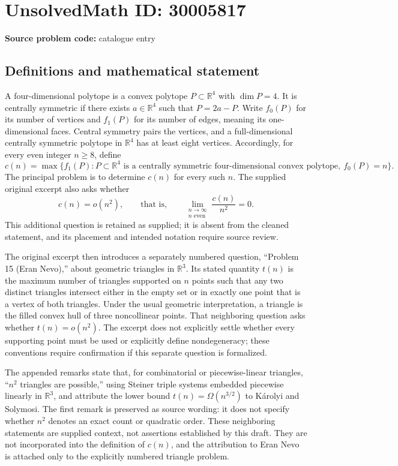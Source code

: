 \documentclass[11pt]{article}
\newcommand{\R}{\mathbb{R}}
\begin{document}
\section*{UnsolvedMath ID: 30005817}
\textbf{Source problem code:} catalogue entry
\subsection{Definitions and mathematical statement}
A four-dimensional polytope is a convex polytope \(P\subset\R^4\) with \(\dim P=4\). It is centrally symmetric if there exists \(a\in\R^4\) such that \(P=2a-P\). Write \(f_0(P)\) for its number of vertices and \(f_1(P)\) for its number of edges, meaning its one-dimensional faces. Central symmetry pairs the vertices, and a full-dimensional centrally symmetric polytope in \(\R^4\) has at least eight vertices. Accordingly, for every even integer \(n\geq8\), define
\[
c(n)=\max\{f_1(P):P\subset\R^4\text{ is a centrally symmetric four-dimensional convex polytope},\ f_0(P)=n\}.
\]
The principal problem is to determine \(c(n)\) for every such \(n\). The supplied original excerpt also asks whether
\[
c(n)=o(n^2),\qquad\text{that is,}\qquad
\lim_{\substack{n\to\infty\\n\text{ even}}}\frac{c(n)}{n^2}=0.
\]
This additional question is retained as supplied; it is absent from the cleaned statement, and its placement and intended notation require source review.

The original excerpt then introduces a separately numbered question, ``Problem 15 (Eran Nevo),'' about geometric triangles in \(\R^3\). Its stated quantity \(t(n)\) is the maximum number of triangles supported on \(n\) points such that any two distinct triangles intersect either in the empty set or in exactly one point that is a vertex of both triangles. Under the usual geometric interpretation, a triangle is the filled convex hull of three noncollinear points. That neighboring question asks whether \(t(n)=o(n^2)\). The excerpt does not explicitly settle whether every supporting point must be used or explicitly define nondegeneracy; these conventions require confirmation if this separate question is formalized.

The appended remarks state that, for combinatorial or piecewise-linear triangles, ``\(n^2\) triangles are possible,'' using Steiner triple systems embedded piecewise linearly in \(\R^3\), and attribute the lower bound \(t(n)=\Omega(n^{3/2})\) to K\'arolyi and Solymosi. The first remark is preserved as source wording: it does not specify whether \(n^2\) denotes an exact count or quadratic order. These neighboring statements are supplied context, not assertions established by this draft. They are not incorporated into the definition of \(c(n)\), and the attribution to Eran Nevo is attached only to the explicitly numbered triangle problem.
\end{document}
